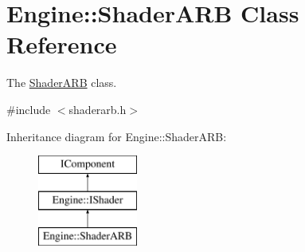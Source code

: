 \hypertarget{classEngine_1_1ShaderARB}{}\section{Engine\+:\+:Shader\+A\+R\+B Class Reference}
\label{classEngine_1_1ShaderARB}


The \hyperlink{classEngine_1_1ShaderARB}{Shader\+A\+R\+B} class.  




{\ttfamily \#include $<$shaderarb.\+h$>$}

Inheritance diagram for Engine\+:\+:Shader\+A\+R\+B\+:\begin{figure}[H]
\begin{center}
\leavevmode
\includegraphics[height=3.000000cm]{classEngine_1_1ShaderARB}
\end{center}
\end{figure}

